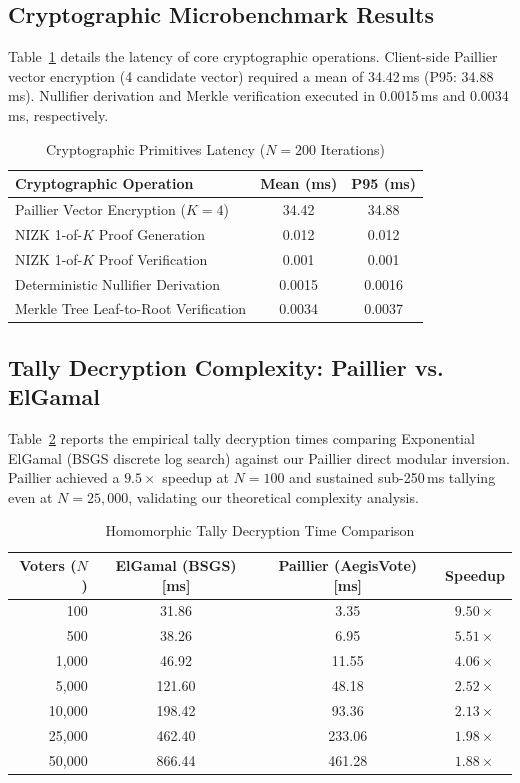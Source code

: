 \documentclass[journal,10pt,twocolumn]{IEEEtran}
\begin{document}
\subsection{Cryptographic Microbenchmark Results}
Table~\ref{tab:crypto_micro} details the latency of core cryptographic operations. Client-side Paillier vector encryption (4 candidate vector) required a mean of 34.42\,ms (P95: 34.88\,ms). Nullifier derivation and Merkle verification executed in 0.0015\,ms and 0.0034\,ms, respectively.

\begin{table}[h]
\centering
\caption{Cryptographic Primitives Latency ($N=200$ Iterations)}
\label{tab:crypto_micro}
\begin{tabular}{lcc}
\toprule
\textbf{Cryptographic Operation} & \textbf{Mean (ms)} & \textbf{P95 (ms)} \\
\midrule
Paillier Vector Encryption ($K=4$) & 34.42 & 34.88 \\
NIZK 1-of-$K$ Proof Generation & 0.012 & 0.012 \\
NIZK 1-of-$K$ Proof Verification & 0.001 & 0.001 \\
Deterministic Nullifier Derivation & 0.0015 & 0.0016 \\
Merkle Tree Leaf-to-Root Verification & 0.0034 & 0.0037 \\
\bottomrule
\end{tabular}
\end{table}

\subsection{Tally Decryption Complexity: Paillier vs. ElGamal}
Table~\ref{tab:tally_comp} reports the empirical tally decryption times comparing Exponential ElGamal (BSGS discrete log search) against our Paillier direct modular inversion. Paillier achieved a $9.5\times$ speedup at $N=100$ and sustained sub-250\,ms tallying even at $N=25,000$, validating our theoretical complexity analysis.

\begin{table}[h]
\centering
\caption{Homomorphic Tally Decryption Time Comparison}
\label{tab:tally_comp}
\begin{tabular}{rccc}
\toprule
\textbf{Voters ($N$)} & \textbf{ElGamal (BSGS) [ms]} & \textbf{Paillier (AegisVote) [ms]} & \textbf{Speedup} \\
\midrule
100    & 31.86  & 3.35   & $9.50\times$ \\
500    & 38.26  & 6.95   & $5.51\times$ \\
1,000  & 46.92  & 11.55  & $4.06\times$ \\
5,000  & 121.60 & 48.18  & $2.52\times$ \\
10,000 & 198.42 & 93.36  & $2.13\times$ \\
25,000 & 462.40 & 233.06 & $1.98\times$ \\
50,000 & 866.44 & 461.28 & $1.88\times$ \\
\bottomrule
\end{tabular}
\end{table}
\end{document}
